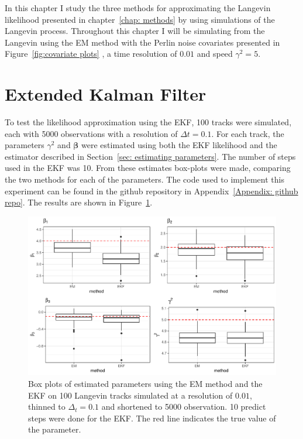 


In this chapter I study the three methods for approximating the Langevin likelihood presented in chapter~\ref{chap: methods} by using simulations of the Langevin process. Throughout this chapter I will be simulating from the Langevin using the EM method with the Perlin noise covariates presented in Figure~\ref{fig:covariate plots} , a time resolution of $0.01$ and speed $\gamma^2=5$.




\section{Extended Kalman Filter}
\label{sec: EKF test}
To test the likelihood approximation using the EKF, 100 tracks were simulated, each with 5000 observations with a resolution of $\Delta t = 0.1$. For each track, the parameters $\gamma^2$ and $\bm \beta$ were estimated using both the EKF likelihood and the estimator described in Section~\ref{sec: estimating parameters}. The number of steps used in the EKF was 10. From these estimates box-plots were made, comparing the two methods for each of the parameters. The code used to implement this experiment can be found in the github repository in Appendix~\ref{Appendix: github repo}. The results are shown in Figure~\ref{fig:EKF_thin_boxplot}.

 

\begin{figure}[H]
    \centering
    \includegraphics[width=\linewidth]{Images/Results/EM EKF plot.pdf}
    \caption[EM and EKF estimates]{Box plots of estimated parameters using the EM method and the EKF on 100 Langevin tracks simulated at a resolution of $0.01$, thinned to $\Delta_t=0.1$ and shortened to 5000 observation. 10 predict steps were done for the EKF. The red line indicates the true value of the parameter.}
    \label{fig:EKF_thin_boxplot}
\end{figure}

